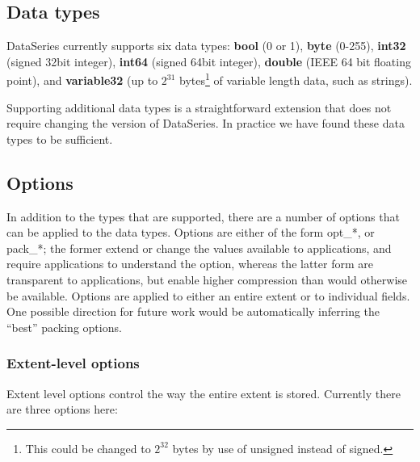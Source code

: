 \subsection{Data types}

DataSeries currently supports six data types:
\textbf{bool} (0 or 1),
\textbf{byte} (0-255),
\textbf{int32} (signed 32bit integer),
\textbf{int64} (signed 64bit integer),
\textbf{ double} (IEEE 64 bit floating point), and
\textbf{variable32} (up to $2^{31}$ bytes\footnote{This could be changed to $2^{32}$ bytes by use of unsigned instead of signed.} of variable length data, such as strings).

Supporting additional data types is a straightforward extension that
does not require changing the version of DataSeries.  In practice we
have found these data types to be sufficient.

\subsection{Options}\label{sec:options}

In addition to the types that are supported, there are a number of
options that can be applied to the data types.  Options are either of
the form opt\_*, or pack\_*; the former extend or change the values
available to applications, and require applications to understand the
option, whereas the latter form are transparent to applications, but
enable higher compression than would otherwise be available. Options
are applied to either an entire extent or to individual fields.  One
possible direction for future work would be automatically inferring
the ``best'' packing options.

\subsubsection{Extent-level options}

Extent level options control the way the entire extent is stored.
Currently there are three options here:

